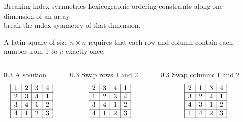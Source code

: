 \documentclass{cons-beamer}
\begin{document}
\begin{frame}{Breaking index symmetries}
  Lexicographic ordering constraints along \alert{one} dimension of an array \\
  break the index symmetry of that dimension. \vfill

  \begin{example}
    \small
    A latin square of size $n \times n$ requires that each row and column contain each number from 1 to $n$ exactly once.
    \vfill

    \begin{columns}
      \begin{column}{0.3\textwidth}
        \centering A solution
        \[
          \begin{array}{|c|c|c|c|}
            \hline
            1 & 2 & 3 & 4 \\
            \hline
            2 & 3 & 4 & 1 \\
            \hline
            3 & 4 & 1 & 2 \\
            \hline
            4 & 1 & 2 & 3 \\
            \hline
          \end{array}
        \]
      \end{column}

      \begin{column}{0.3\textwidth}
        \centering Swap rows 1 and 2
        \[
          \begin{array}{|c|c|c|c|}
            \hline
            2 & 3 & 4 & 1 \\
            \hline
            1 & 2 & 3 & 4 \\
            \hline
            3 & 4 & 1 & 2 \\
            \hline
            4 & 1 & 2 & 3 \\
            \hline
          \end{array}
        \]
      \end{column}

      \begin{column}{0.3\textwidth}
        \centering Swap columns 1 and 2
        \[
          \begin{array}{|c|c|c|c|}
            \hline
            2 & 1 & 3 & 4 \\
            \hline
            3 & 2 & 4 & 1 \\
            \hline
            4 & 3 & 1 & 2 \\
            \hline
            1 & 4 & 2 & 3 \\
            \hline
          \end{array}
        \]
      \end{column}
    \end{columns}
    \vfill


\end{example}
\end{frame}
\end{document}
